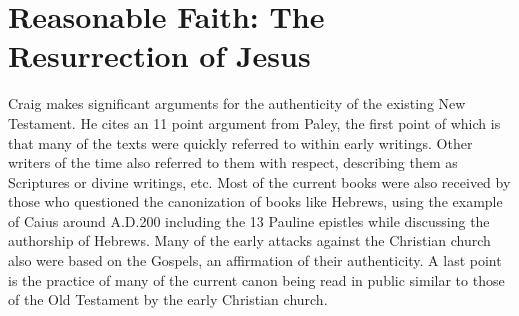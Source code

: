 \documentclass[12pt]{turabian-researchpaper}
\begin{document}
\section{Reasonable Faith: The Resurrection of Jesus}

Craig\autocite[pg. 335-338]{craig2008reasonable} makes significant arguments for the authenticity of the existing New Testament. He cites an 11 point argument from Paley, the first point of which is that many of the texts were quickly referred to within early writings. Other writers of the time also referred to them with respect, describing them as Scriptures or divine writings, etc. Most of the current books were also received by those who questioned the canonization of books like Hebrews, using the example of Caius around A.D.200 including the 13 Pauline epistles while discussing the authorship of Hebrews. Many of the early attacks against the Christian church also were based on the Gospels, an affirmation of their authenticity. A last point is the practice of many of the current canon being read in public similar to those of the Old Testament by the early Christian church.

\newpage
\printbibliography
\end{document}

